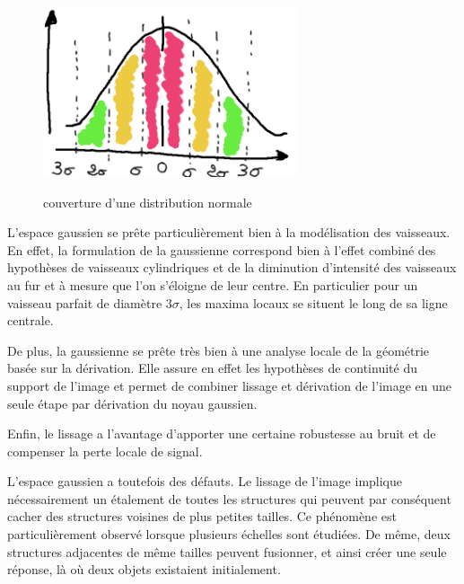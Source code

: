 \begin{figure}
  \centering
  \includegraphics[height=5cm]{Images/normal_distribution_probability_coverage.png}
  \label{fig:normal_distribution_probability_coverage}
  \caption{couverture d'une distribution normale}
\end{figure}

L'espace gaussien se prête particulièrement bien à la modélisation des vaisseaux. En effet, la formulation de la gaussienne correspond bien à l'effet combiné des hypothèses de vaisseaux cylindriques et de la diminution d'intensité des vaisseaux au fur et à mesure que l'on s'éloigne de leur centre. En particulier pour un vaisseau parfait de diamètre $3\sigma$, les maxima locaux se situent le long de sa ligne centrale.

De plus, la gaussienne se prête très bien à une analyse locale de la géométrie basée sur la dérivation. Elle assure en effet les hypothèses de continuité du support de l'image et permet de combiner lissage et dérivation de l'image en une seule étape par dérivation du noyau gaussien.

Enfin, le lissage a l'avantage d'apporter une certaine robustesse au bruit et de compenser la perte locale de signal.

L'espace gaussien a toutefois des défauts. Le lissage de l'image implique nécessairement un étalement de toutes les structures qui peuvent par conséquent cacher des structures voisines de plus petites tailles. Ce phénomène est particulièrement observé lorsque plusieurs échelles sont étudiées. De même, deux structures adjacentes de même tailles peuvent fusionner, et ainsi créer une seule réponse, là où deux objets existaient initialement.

